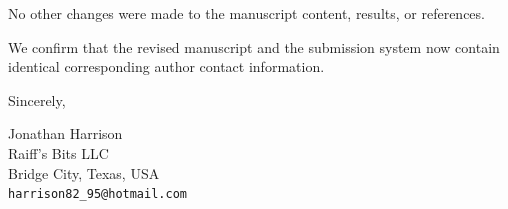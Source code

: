 \documentclass[11pt,a4paper]{article}
\begin{document}
\bigskip

\noindent No other changes were made to the manuscript content, results, or references.

\medskip

\noindent We confirm that the revised manuscript and the submission system now contain identical corresponding author contact information.

\bigskip

\noindent Sincerely,

\medskip

\noindent Jonathan Harrison\\
Raiff's Bits LLC\\
Bridge City, Texas, USA\\
\texttt{harrison82\_95@hotmail.com}
\end{document}
